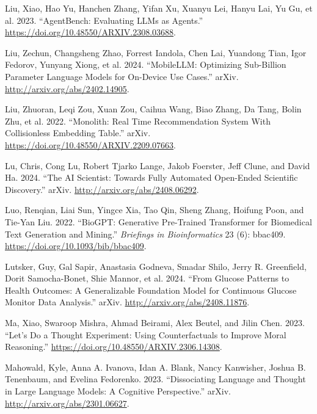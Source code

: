 \documentclass[
  Letterpaper,
]{scrbook}
\newlength{\cslhangindent}
\newenvironment{CSLReferences}[2] %
 {\begin{list}{}{%
  \setlength{\itemindent}{0pt}
  \setlength{\leftmargin}{0pt}
  \setlength{\parsep}{0pt}
  \ifodd #1
   \setlength{\leftmargin}{\cslhangindent}
   \setlength{\itemindent}{-1\cslhangindent}
  \fi
  \setlength{\itemsep}{#2\baselineskip}}}
 {\end{list}}
\begin{document}
\begin{CSLReferences}{1}{0}
Liu, Xiao, Hao Yu, Hanchen Zhang, Yifan Xu, Xuanyu Lei, Hanyu Lai, Yu
Gu, et al. 2023. {``{AgentBench}: {Evaluating} {LLMs} as {Agents}.''}
\url{https://doi.org/10.48550/ARXIV.2308.03688}.

Liu, Zechun, Changsheng Zhao, Forrest Iandola, Chen Lai, Yuandong Tian,
Igor Fedorov, Yunyang Xiong, et al. 2024. {``{MobileLLM}: {Optimizing}
{Sub}-Billion {Parameter} {Language} {Models} for {On}-{Device} {Use}
{Cases}.''} arXiv. \url{http://arxiv.org/abs/2402.14905}.

Liu, Zhuoran, Leqi Zou, Xuan Zou, Caihua Wang, Biao Zhang, Da Tang,
Bolin Zhu, et al. 2022. {``Monolith: {Real} {Time} {Recommendation}
{System} {With} {Collisionless} {Embedding} {Table}.''} arXiv.
\url{https://doi.org/10.48550/ARXIV.2209.07663}.

Lu, Chris, Cong Lu, Robert Tjarko Lange, Jakob Foerster, Jeff Clune, and
David Ha. 2024. {``The {AI} {Scientist}: {Towards} {Fully} {Automated}
{Open}-{Ended} {Scientific} {Discovery}.''} arXiv.
\url{http://arxiv.org/abs/2408.06292}.

Luo, Renqian, Liai Sun, Yingce Xia, Tao Qin, Sheng Zhang, Hoifung Poon,
and Tie-Yan Liu. 2022. {``{BioGPT}: Generative Pre-Trained Transformer
for Biomedical Text Generation and Mining.''} \emph{Briefings in
Bioinformatics} 23 (6): bbac409.
\url{https://doi.org/10.1093/bib/bbac409}.

Lutsker, Guy, Gal Sapir, Anastasia Godneva, Smadar Shilo, Jerry R.
Greenfield, Dorit Samocha-Bonet, Shie Mannor, et al. 2024. {``From
{Glucose} {Patterns} to {Health} {Outcomes}: {A} {Generalizable}
{Foundation} {Model} for {Continuous} {Glucose} {Monitor} {Data}
{Analysis}.''} arXiv. \url{http://arxiv.org/abs/2408.11876}.

Ma, Xiao, Swaroop Mishra, Ahmad Beirami, Alex Beutel, and Jilin Chen.
2023. {``Let's {Do} a {Thought} {Experiment}: {Using} {Counterfactuals}
to {Improve} {Moral} {Reasoning}.''}
\url{https://doi.org/10.48550/ARXIV.2306.14308}.

Mahowald, Kyle, Anna A. Ivanova, Idan A. Blank, Nancy Kanwisher, Joshua
B. Tenenbaum, and Evelina Fedorenko. 2023. {``Dissociating Language and
Thought in Large Language Models: A Cognitive Perspective.''} arXiv.
\url{http://arxiv.org/abs/2301.06627}.


\end{CSLReferences}
\end{document}
